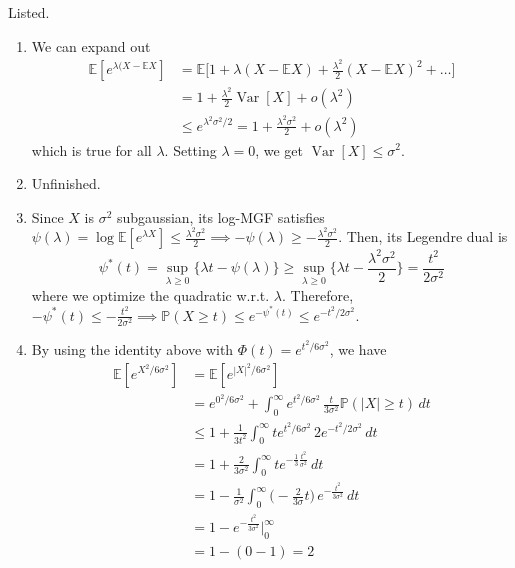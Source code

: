 \documentclass{article}
\DeclareMathOperator{\Var}{Var}
\begin{document}
  \begin{solution}
  Listed. 
  \begin{enumerate}
      \item We can expand out 
      \begin{align*}
          \mathbb{E}[e^{\lambda (X - \mathbb{E} X}] & = \mathbb{E} \bigg[ 1 + \lambda( X - \mathbb{E}X) + \frac{\lambda^2}{2} (X - \mathbb{E} X)^2 + \ldots \bigg] \\
          & = 1 + \frac{\lambda^2}{2} \Var[X] + o(\lambda^2) \\
          & \leq e^{\lambda^2 \sigma^2 / 2} = 1 + \frac{\lambda^2 \sigma^2}{2} + o (\lambda^2)
      \end{align*}
      which is true for all $\lambda$. Setting $\lambda = 0$, we get $\Var[X] \leq \sigma^2$. 
      
      \item Unfinished. 
      
      \item Since $X$ is $\sigma^2$ subgaussian, its log-MGF satisfies $\psi(\lambda) = \log \mathbb{E}[e^{\lambda X}] \leq \frac{\lambda^2 \sigma^2}{2} \implies - \psi(\lambda) \geq - \frac{\lambda^2 \sigma^2}{2}$. Then, its Legendre dual is 
      \[\psi^\ast (t) = \sup_{\lambda \geq 0} \{ \lambda t - \psi(\lambda)\} \geq \sup_{\lambda \geq 0} \{ \lambda t - \frac{\lambda^2 \sigma^2}{2} \} = \frac{t^2}{2 \sigma^2}\]
      where we optimize the quadratic w.r.t. $\lambda$. Therefore, $-\psi^* (t) \leq - \frac{t^2}{2\sigma^2} \implies \mathbb{P}(X \geq t) \leq e^{ - \psi^* (t)} \leq e^{- t^2/ 2 \sigma^2}$. 
      
      
      \item By using the identity above with $\Phi(t) = e^{t^2 / 6 \sigma^2}$, we have 
      \begin{align*}
          \mathbb{E}[e^{X^2 / 6 \sigma^2}] & = \mathbb{E}[e^{|X|^2 / 6 \sigma^2}] \\
          & = e^{0^2 / 6 \sigma^2} + \int_0^\infty e^{t^2 / 6 \sigma^2} \, \frac{t}{3 \sigma^2} \mathbb{P}(|X| \geq t) \, dt \\
          & \leq 1 + \frac{1}{3t^2} \int_0^\infty t e^{t^2 / 6 \sigma^2} \, 2 e^{-t^2 / 2\sigma^2} \, dt\\
          & = 1 + \frac{2}{3 \sigma^2} \int_0^\infty t e^{-\frac{1}{3} \frac{t^2}{\sigma^2}} \, dt \\
          & = 1 - \frac{1}{\sigma^2} \int_0^\infty \Big( - \frac{2}{3 \sigma} t \Big) \, e^{- \frac{t^2}{3 \sigma^2}} \, dt \\
          & = 1 - e^{- \frac{t^2}{3 \sigma^2}} \bigg|_0^\infty \\
          & = 1 - (0 - 1) = 2 
      \end{align*}
      

\end{enumerate}
\end{solution}
\end{document}
